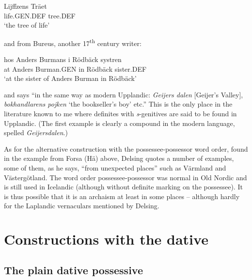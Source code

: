 
\ea\label{}
\gll Lijffzens  Träet\\
life.GEN.DEF  tree.DEF\\
\glt  ‘the tree of life’
\z

and from Bureus, another 17\textsuperscript{th} century writer:


\ea\label{}
\gll hos  Anders  Burmans  i  Rödbäck  systren\\
at  Anders  Burman.GEN  in  Rödbäck  sister.DEF\\
\glt ‘at the sister of Anders Burman in Rödbäck’
\z

and says “in the same way as modern Upplandic: \textit{Geijers dalen }[Geijer’s Valley], \textit{bokhandlarens pojken} ‘the bookseller’s boy’ etc.” This is the only place in the literature known to me where definites with \textit{s}{}-genitives are said to be found in Upplandic. (The first example is clearly a compound in the modern language, spelled \textit{Geijersdalen}.)


As for the alternative construction with the possessee-possessor word order, found in the example from Forsa (Hä) above, Delsing quotes a number of examples, some of them, as he says, “from unexpected places” such as Värmland and Västergötland. The word order possessee-possessor was normal in Old Nordic and is still used in Icelandic (although without definite marking on the possessee). It is thus possible that it is an archaism at least in some places – although hardly for the Laplandic vernaculars mentioned by Delsing.


\section{Constructions with the dative}
\label{bkm:Ref136427895}\subsection{The plain dative possessive}

